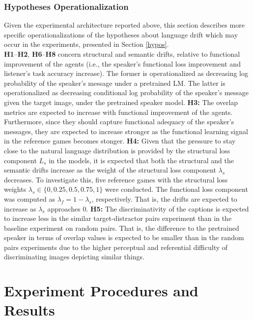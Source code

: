 \subsubsection{Hypotheses Operationalization}
Given the experimental architecture reported above, this section describes more specific operationalizations of the hypotheses about language drift which may occur in the experiments, presented in Section \ref{hypos}.\\
\newline
\textbf{H1}--\textbf{H2}, \textbf{H6}--\textbf{H8} concern structural and semantic drifts, relative to functional improvement of the agents (i.e., the speaker's functional loss improvement and listener's task accuracy increase). The former is operationalized as decreasing log probability of the speaker's message under a pretrained LM. The latter is operationalized as decreasing conditional log probability of the speaker's message given the target image, under the pretrained speaker model. \newline
\textbf{H3:} The overlap metrics are expected to increase with functional improvement of the agents. Furthermore, since they should capture functional adequacy of the speaker's messages, they are expected to increase stronger as the functional learning signal in the reference games becomes stonger.\newline
\textbf{H4:} Given that the pressure to stay close to the natural language distribution is provided by the structural loss component $L_s$ in the models, it is expected that both the structural and the semantic drifts increase as the weight of the structural loss component $\lambda_s$ decreases. To investigate this, five reference games with the structural loss weights $\lambda_s \in \{0, 0.25, 0.5, 0.75, 1\}$ were conducted. The functional loss component was computed as $\lambda_f = 1 - \lambda_s$, respectively. That is, the drifts are expected to increase as $\lambda_s$ approaches 0.\newline
\textbf{H5:} The discriminativity of the captions is expected to increase less in the similar target-distractor pairs experiment than in the baseline experiment on random pairs. That is, the difference to the pretrained speaker in terms of overlap values is expected to be smaller than in the random pairs experiments due to the higher perceptual and referential difficulty of discriminating images depicting similar things. 

\section{Experiment Procedures and Results}

